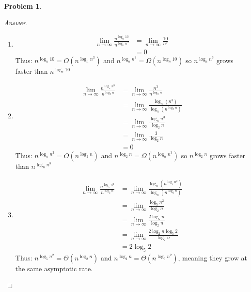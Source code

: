 \documentclass[11pt]{article}
\theoremstyle{definition}
\theoremstyle{definition}
\newtheorem{required}{Problem}
\theoremstyle{definition}
\begin{document}
\begin{required}
\begin{enumerate}[label=(\alph*)]
\begin{proof}[Answer]
\begin{enumerate}
\item
\begin{align*}
\lim_{n \to \infty} \frac{n^{\log_n 10}}{n^{\log_n n^3}} 
&=\lim_{n \to \infty} \frac{10}{n^3} \\
&=0
\end{align*}
Thus: $n^{\log_n 10}= O(n^{\log_n n^3})$ and $n^{\log_n n^3}= \Omega(n^{\log_n 10})$ so $n^{\log_n n^3}$ grows faster than $n^{\log_n 10}$

\item
\begin{align*}
\lim_{n \to \infty} \frac{n^{\log_n n^3}}{n^{\log_2 n}} 
&=\lim_{n \to \infty} \frac{n^3}{n^{\log_2 n}} \\
&=\lim_{n \to \infty} \frac{\log_n(n^3)}{\log_n(n^{\log_2 n})} \\
&=\lim_{n \to \infty} \frac{\log_n n^3}{\log_2 n} \\
&=\lim_{n \to \infty} \frac{3}{\log_2 n} \\
&=0
\end{align*}
Thus: $n^{\log_n n^3}= O(n^{\log_ 2 n})$ and $n^{\log_2 n}= \Omega(n^{\log_n n^3})$ so $n^{\log_2 n}$ grows faster than $n^{\log_n n^3}$


\item
\begin{align*}
\lim_{n \to \infty} \frac{n^{\log_5 n^2}}{n^{\log_2 n}} 
&=\lim_{n \to \infty} \frac{\log_n(n^{\log_5 n^2})}{\log_n(n^{\log_2 n})} \\
&=\lim_{n \to \infty} \frac{\log_5 n^2}{\log_2 n} \\
&=\lim_{n \to \infty} \frac{2\log_5 n}{\log_2 n} \\
&=\lim_{n \to \infty} \frac{2\log_2 n \log_5 2}{\log_2 n} \\
&=2\log_5 2
\end{align*}
Thus: $n^{\log_5 n^2}= \Theta(n^{\log_ 2 n})$ and $n^{\log_2 n}= \Theta(n^{\log_ 5 n^2})$, meaning they grow at the same asymptotic rate. 


\end{enumerate}
        \end{proof}




        \newpage


\end{enumerate}
\end{required}
\end{document}
